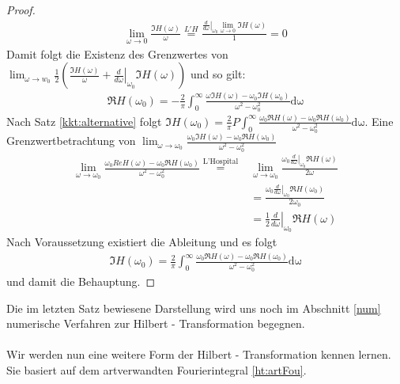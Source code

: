 \begin{satz}
\begin{proof}
\begin{align}
	\lim_{\omega \rightarrow 0} \frac{\Im{H(\omega)}}{\omega} \stackrel{L'H}{=} \frac{\left. \frac{d}{d\omega} \right|_{\omega_0} \lim_{\omega \rightarrow 0}{\Im{H(\omega)}}}{1} = 0
\end{align}
Damit folgt die Existenz des Grenzwertes von $\lim_{\omega \rightarrow w_0}  \frac{1}{2} \left( \frac{\Im{H(\omega)}}{\omega} + \left. \frac{d}{d\omega} \right|_{\omega_0}\Im{H(\omega)} \right)$ und so gilt:
\begin{align}
\Re{H(\omega_0)} = -\frac{2}{\pi} \int_0^{\infty} \frac{\omega \Im{H(\omega)}-\omega_0 \Im{H(\omega_0)}}{\omega^2 - \omega^2_0} \mathrm{d\omega}
\end{align}
Nach Satz \ref{kkt:alternative} folgt $\Im{H(\omega_0)} = \frac{2}{\pi} P \int_0^{\infty} \frac{\omega_0 \Re{H(\omega)}-\omega_0 \Re{H(\omega_0)}}{\omega^2 - \omega^2_0} \mathrm{d\omega}$. Eine Grenzwertbetrachtung von $\lim_{\omega \rightarrow \omega_0} \frac{\omega_0 \Im{H(\omega)}-\omega_0 \Re{H(\omega_0)}}{\omega^2 - \omega^2_0}$
\begin{align}
\lim_{\omega \rightarrow \omega_0} \frac{\omega_0 Re{H(\omega)}-\omega_0 \Re{H(\omega_0)}}{\omega^2 - \omega^2_0} \stackrel{\text{L'Hospital}}{=} &\lim_{\omega \rightarrow \omega_0} \frac{\omega_0 \left. \frac{d}{d\omega}\right|_{\omega_0}\Re{H(\omega)}}{2 \omega} \\
&= \frac{\omega_0 \left. \frac{d}{d\omega} \right|_{\omega_0}\Re{H(\omega_0)}}{2 \omega_0} \\
&= \frac{1}{2}\left.\frac{d}{d\omega}\right|_{\omega_0}\Re{H(\omega)}
\end{align}
Nach Voraussetzung existiert die Ableitung und es folgt
\begin{align}
	\Im{H(\omega_0)} = \frac{2}{\pi} \int_0^{\infty} \frac{\omega_0 \Re{H(\omega)}-\omega_0 \Re{H(\omega_0)}}{\omega^2 - \omega^2_0} \mathrm{d\omega}
\end{align}
und damit die Behauptung.
\end{proof}
\end{satz}
Die im letzten Satz bewiesene Darstellung wird uns noch im Abschnitt \ref{num} numerische Verfahren zur Hilbert - Transformation  begegnen. \\\\
Wir werden nun eine weitere Form der Hilbert - Transformation kennen lernen. Sie basiert auf dem artverwandten Fourierintegral \ref{ht:artFou}.
